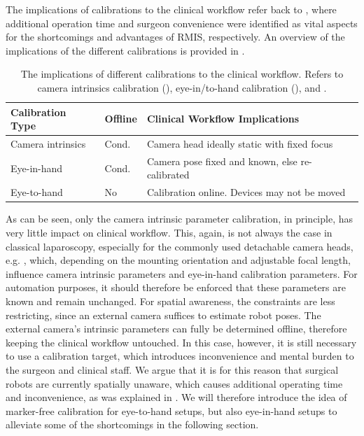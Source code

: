The implications of calibrations to the clinical workflow refer back to , where additional operation time and surgeon convenience were identified as vital aspects for the shortcomings and advantages of RMIS, respectively. An overview of the implications of the different calibrations is provided in .
\begin{table}[htb]
\centering
\caption{The implications of different calibrations to the clinical workflow. Refers to camera intrinsics calibration (), eye-in/to-hand calibration (), and .}
\label{in:tab:calibrations}
\begin{tabular}{@{}lll@{}}
\toprule
Calibration Type  & Offline       & Clinical Workflow Implications \\ \midrule
Camera intrinsics & Cond.         & Camera head ideally static with fixed focus \\
Eye-in-hand       & Cond. & Camera pose fixed and known, else re-calibrated \\
Eye-to-hand       & No            &  Calibration online. Devices may not be moved \\ \bottomrule
\end{tabular}
\end{table}
As can be seen, only the camera intrinsic parameter calibration, in principle, has very little impact on clinical workflow. This, again, is not always the case in classical laparoscopy, especially for the commonly used detachable camera heads, e.g. , which, depending on the mounting orientation and adjustable focal length, influence camera intrinsic parameters and eye-in-hand calibration parameters. For automation purposes, it should therefore be enforced that these parameters are known and remain unchanged. For spatial awareness, the constraints are less restricting, since an external camera suffices to estimate robot poses. The external camera's intrinsic parameters can fully be determined offline, therefore keeping the clinical workflow untouched. In this case, however, it is still necessary to use a calibration target, which introduces inconvenience and mental burden to the surgeon and clinical staff. We argue that it is for this reason that surgical robots are currently spatially unaware, which causes additional operating time and inconvenience, as was explained in . We will therefore introduce the idea of marker-free calibration for eye-to-hand setups, but also eye-in-hand setups to alleviate some of the shortcomings in the following section.

